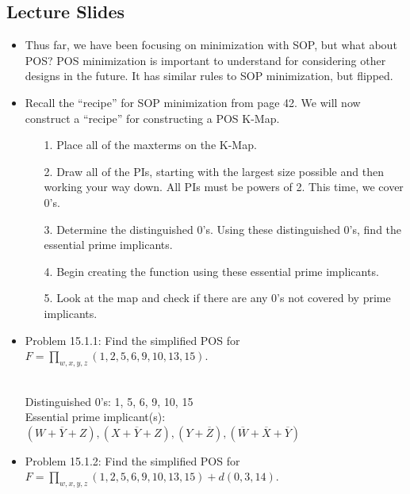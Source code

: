 \documentclass[10pt,a4paper]{article}
\newcommand{\answer}[1]{\boxed{\text{Answer: #1}}}
\newcommand{\ol}[1]{\overline{#1}}
\begin{document}
\subsection{Lecture Slides}
\begin{itemize}
\item Thus far, we have been focusing on minimization with SOP, but what about POS? POS minimization is important to understand for considering other designs in the future. It has similar rules to SOP minimization, but flipped. 
\item Recall the ``recipe'' for SOP minimization from page 42. We will now construct a ``recipe'' for constructing a POS K-Map.
\begin{enumerate}
\item [1.] Place all of the maxterms on the K-Map.
\item [2.] Draw all of the PIs, starting with the largest size possible and then working your way down. All PIs must be powers of 2. This time, we cover 0's. 
\item [3.] Determine the distinguished 0's. Using these distinguished 0's, find the essential prime implicants. 
\item [4.] Begin creating the function using these essential prime implicants.
\item [5.] Look at the map and check if there are any 0's not covered by prime implicants. 
\end{enumerate}
\item Problem 15.1.1: Find the simplified POS for $F=\prod_{w,x,y,z}(1,2,5,6,9,10,13,15)$.\\
\\
Distinguished 0's: 1, 5, 6, 9, 10, 15\\
Essential prime implicant(s): $(W+\ol{Y}+Z), (X+\ol{Y}+Z), (Y+\ol{Z}), (\ol{W}+\ol{X}+\ol{Y})$\\
\answer{$F=(W+\ol{Y}+Z)(X+\ol{Y}+Z)(Y+\ol{Z})(\ol{W}+\ol{X}+\ol{Y})$}
\pagebreak
\item Problem 15.1.2: Find the simplified POS for $F=\prod_{w,x,y,z}(1,2,5,6,9,10,13,15)+d(0,3,14)$.\\

\end{itemize}
\end{document}
